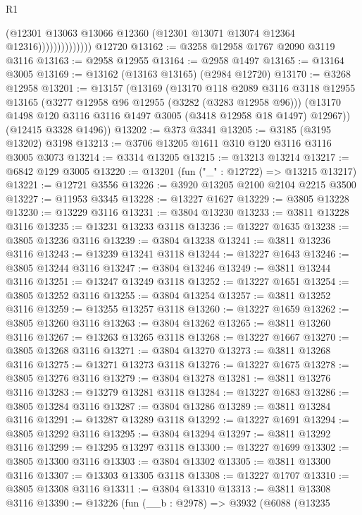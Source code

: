 \begin{lexlean}{R1}
\begin{coremodule}
                            (@12301
                              @13063
                              @13066
                              @12360
                              (@12301 @13071 @13074 @12364 @12316))))))))))))))
    @12720
@13162 := @3258 @12958 @1767 @2090 @3119 @3116
@13163 := @2958 @12955
@13164 := @2958 @1497
@13165 := @13164 @3005
@13169 := @13162 (@13163 @13165) (@2984 @12720)
@13170 := @3268 @12958
@13201 := @13157
    (@13169
      (@13170
        @118
        @2089
        @3116
        @3118
        @12955
        @13165
        (@3277 @12958 @96 @12955 (@3282 (@3283 @12958 @96)))
        (@13170 @1498 @120 @3116 @3116 @1497 @3005 (@3418 @12958 @18 @1497) @12967))
      (@12415 @3328 @1496))
@13202 := @373 @3341
@13205 := @3185 (@3195 @13202) @3198
@13213 := @3706 @13205 @1611 @310 @120 @3116 @3116 @3005 @3073
@13214 := @3314 @13205
@13215 := @13213 @13214
@13217 := @6842 @129 @3005
@13220 := @13201 (fun ("_" : @12722) => @13215 @13217)
@13221 := @12721 @3556
@13226 := @3920 @13205 @2100 @2104 @2215 @3500
@13227 := @11953 @3345
@13228 := @13227 @1627
@13229 := @3805 @13228
@13230 := @13229 @3116
@13231 := @3804 @13230
@13233 := @3811 @13228 @3116
@13235 := @13231 @13233 @3118
@13236 := @13227 @1635
@13238 := @3805 @13236 @3116
@13239 := @3804 @13238
@13241 := @3811 @13236 @3116
@13243 := @13239 @13241 @3118
@13244 := @13227 @1643
@13246 := @3805 @13244 @3116
@13247 := @3804 @13246
@13249 := @3811 @13244 @3116
@13251 := @13247 @13249 @3118
@13252 := @13227 @1651
@13254 := @3805 @13252 @3116
@13255 := @3804 @13254
@13257 := @3811 @13252 @3116
@13259 := @13255 @13257 @3118
@13260 := @13227 @1659
@13262 := @3805 @13260 @3116
@13263 := @3804 @13262
@13265 := @3811 @13260 @3116
@13267 := @13263 @13265 @3118
@13268 := @13227 @1667
@13270 := @3805 @13268 @3116
@13271 := @3804 @13270
@13273 := @3811 @13268 @3116
@13275 := @13271 @13273 @3118
@13276 := @13227 @1675
@13278 := @3805 @13276 @3116
@13279 := @3804 @13278
@13281 := @3811 @13276 @3116
@13283 := @13279 @13281 @3118
@13284 := @13227 @1683
@13286 := @3805 @13284 @3116
@13287 := @3804 @13286
@13289 := @3811 @13284 @3116
@13291 := @13287 @13289 @3118
@13292 := @13227 @1691
@13294 := @3805 @13292 @3116
@13295 := @3804 @13294
@13297 := @3811 @13292 @3116
@13299 := @13295 @13297 @3118
@13300 := @13227 @1699
@13302 := @3805 @13300 @3116
@13303 := @3804 @13302
@13305 := @3811 @13300 @3116
@13307 := @13303 @13305 @3118
@13308 := @13227 @1707
@13310 := @3805 @13308 @3116
@13311 := @3804 @13310
@13313 := @3811 @13308 @3116
@13390 := @13226
    (fun (__b : @2978) =>
    @3932
      (@6088
        (@13235

\end{coremodule}
\end{lexlean}

